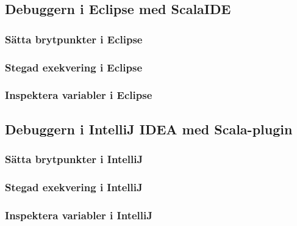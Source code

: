 \subsection{Debuggern i Eclipse med ScalaIDE}
\subsubsection{Sätta brytpunkter i Eclipse}\TODO
\subsubsection{Stegad exekvering i Eclipse}\TODO
\subsubsection{Inspektera variabler i Eclipse}\TODO

\subsection{Debuggern i IntelliJ IDEA med Scala-plugin}
\subsubsection{Sätta brytpunkter i IntelliJ}\TODO
\subsubsection{Stegad exekvering i IntelliJ}\TODO
\subsubsection{Inspektera variabler i IntelliJ}\TODO